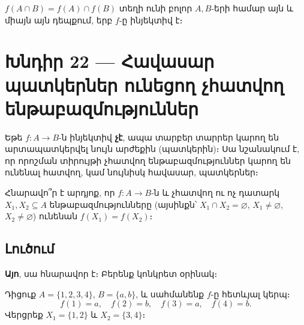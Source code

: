 \documentclass[12pt, a4paper]{article}
\begin{document}
\begin{answerbox}
$f(A \cap B) = f(A) \cap f(B)$ տեղի ունի բոլոր $A, B$-երի համար այն և միայն այն դեպքում, երբ $f$-ը ինյեկտիվ է։
\end{answerbox}

\newpage
\section{Խնդիր 22 — Հավասար պատկերներ ունեցող չհատվող ենթաբազմություններ}

\begin{theorybox}
Եթե $f : A \to B$-ն ինյեկտիվ \textbf{չէ}, ապա տարբեր տարրեր կարող են արտապատկերվել նույն
արժեքին (պատկերին)։ Սա նշանակում է, որ որոշման տիրույթի չհատվող ենթաբազմություններ կարող են
ունենալ հատվող, կամ նույնիսկ հավասար, պատկերներ։
\end{theorybox}

\begin{problembox}
Հնարավո՞ր է արդյոք, որ $f : A \to B$-ն և չհատվող ու ոչ դատարկ $X_1, X_2 \subseteq A$ ենթաբազմությունները
(այսինքն՝ $X_1 \cap X_2 = \varnothing$, $X_1 \neq \varnothing$, $X_2 \neq \varnothing$)
ունենան $f(X_1) = f(X_2)$։
\end{problembox}

\subsection*{Լուծում}

\textbf{Այո}, սա հնարավոր է։ Բերենք կոնկրետ օրինակ։

Դիցուք $A = \{1, 2, 3, 4\}$, $B = \{a, b\}$, և սահմանենք $f$-ը հետևյալ կերպ։
\[
  f(1) = a, \quad f(2) = b, \quad f(3) = a, \quad f(4) = b.
\]
Վերցրեք $X_1 = \{1, 2\}$ և $X_2 = \{3, 4\}$։
\end{document}

